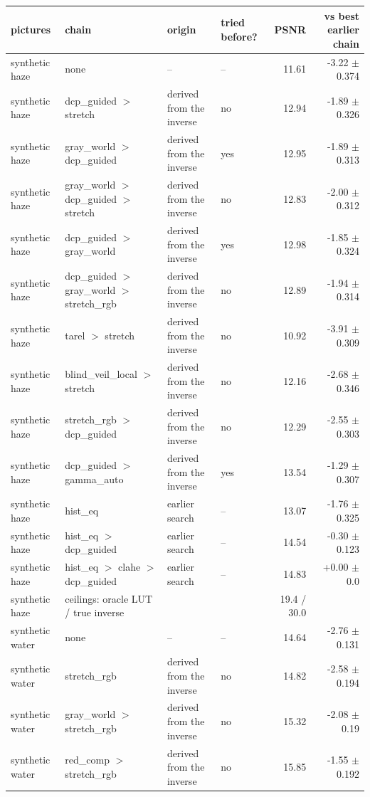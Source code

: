 \begin{longtable}{llllrr}
\toprule
pictures & chain & origin & tried before? & PSNR & vs best earlier chain \\
\midrule
\endhead
synthetic haze & none & -- & -- & 11.61 & -3.22 $\pm$ 0.374 \\
synthetic haze & dcp\_guided $>$ stretch & derived from the inverse & no & 12.94 & -1.89 $\pm$ 0.326 \\
synthetic haze & gray\_world $>$ dcp\_guided & derived from the inverse & yes & 12.95 & -1.89 $\pm$ 0.313 \\
synthetic haze & gray\_world $>$ dcp\_guided $>$ stretch & derived from the inverse & no & 12.83 & -2.00 $\pm$ 0.312 \\
synthetic haze & dcp\_guided $>$ gray\_world & derived from the inverse & yes & 12.98 & -1.85 $\pm$ 0.324 \\
synthetic haze & dcp\_guided $>$ gray\_world $>$ stretch\_rgb & derived from the inverse & no & 12.89 & -1.94 $\pm$ 0.314 \\
synthetic haze & tarel $>$ stretch & derived from the inverse & no & 10.92 & -3.91 $\pm$ 0.309 \\
synthetic haze & blind\_veil\_local $>$ stretch & derived from the inverse & no & 12.16 & -2.68 $\pm$ 0.346 \\
synthetic haze & stretch\_rgb $>$ dcp\_guided & derived from the inverse & no & 12.29 & -2.55 $\pm$ 0.303 \\
synthetic haze & dcp\_guided $>$ gamma\_auto & derived from the inverse & yes & 13.54 & -1.29 $\pm$ 0.307 \\
synthetic haze & hist\_eq & earlier search & -- & 13.07 & -1.76 $\pm$ 0.325 \\
synthetic haze & hist\_eq $>$ dcp\_guided & earlier search & -- & 14.54 & -0.30 $\pm$ 0.123 \\
synthetic haze & hist\_eq $>$ clahe $>$ dcp\_guided & earlier search & -- & 14.83 & +0.00 $\pm$ 0.0 \\
synthetic haze & ceilings: oracle LUT / true inverse &  &  & 19.4 / 30.0 &  \\
synthetic water & none & -- & -- & 14.64 & -2.76 $\pm$ 0.131 \\
synthetic water & stretch\_rgb & derived from the inverse & no & 14.82 & -2.58 $\pm$ 0.194 \\
synthetic water & gray\_world $>$ stretch\_rgb & derived from the inverse & no & 15.32 & -2.08 $\pm$ 0.19 \\
synthetic water & red\_comp $>$ stretch\_rgb & derived from the inverse & no & 15.85 & -1.55 $\pm$ 0.192 \\

\end{longtable}

